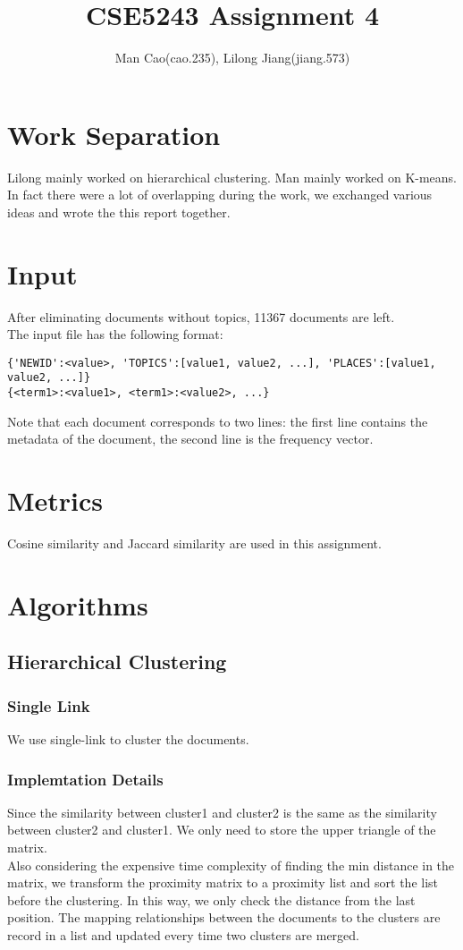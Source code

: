 \documentclass{article}
\begin{document}
\title{CSE5243 Assignment 4}
\author{Man Cao(cao.235), Lilong Jiang(jiang.573)}
\maketitle

\section{Work Separation}
Lilong mainly worked on hierarchical clustering. Man mainly worked on
K-means. In fact there were a lot of overlapping during the
work, we exchanged various ideas and wrote the this report together.
\section{Input}
After eliminating documents without topics, 11367 documents are left.\\
The input file has the following format:
\begin{verbatim}
{'NEWID':<value>, 'TOPICS':[value1, value2, ...], 'PLACES':[value1, value2, ...]}
{<term1>:<value1>, <term1>:<value2>, ...}
\end{verbatim}
Note that each document corresponds to two lines: the first line contains the
metadata of the document, the second line is the frequency vector.

\section{Metrics}
Cosine similarity and Jaccard similarity are used in this assignment.

\section{Algorithms}
\subsection{Hierarchical Clustering}
\subsubsection{Single Link}
We use single-link to cluster the documents.
\subsubsection{Implemtation Details}
Since the similarity between cluster1 and cluster2 is the same as the similarity between cluster2 and cluster1. We only need to store the upper triangle of the matrix.\\
Also considering the expensive time complexity of finding the min distance in the matrix, we transform the proximity matrix to a proximity list and sort the list before the clustering. In this way, we only check the distance from the last position. The mapping relationships between the documents to the clusters are record in a list and updated every time two clusters are merged.  
\end{document}
